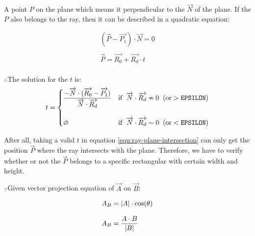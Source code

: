 A point $P$ on the plane which means it perpendicular to the $\overrightarrow{N}$ of the plane. If the $P$ also belongs to the ray, then it can be described in a quadratic equation:

\begin{equation}
\label{equ:ray-plane-intersection}
\begin{array}{lr}
(\overrightarrow{P} - \overrightarrow{P_1}) \cdot \overrightarrow{N} = 0\\\\
\overrightarrow{P} = \overrightarrow{R_0} + \overrightarrow{R_d} \cdot t\\
\end{array}
\end{equation}

$\therefore$\;\;\;\;The solution for the $t$ is:
\[
t =
\begin{cases}
\dfrac{-\overrightarrow{N} \cdot (\overrightarrow{R_0} - \overrightarrow{P_1})}{\overrightarrow{N} \cdot \overrightarrow{R_d}} & \text{if }\;\overrightarrow{N} \cdot \overrightarrow{R_d} \nsim 0\;\;(\text{or} > \texttt{EPSILON})\\\\
\varnothing & \text{if }\;\overrightarrow{N} \cdot \overrightarrow{R_d} \sim 0\;\;(\text{or} < \texttt{EPSILON})\\
\end{cases}
\]

After all, taking a valid $t$ in equation \ref{equ:ray-plane-intersection} can only get the position $\overrightarrow{P}$ where the ray intersects with the plane. Therefore, we have to verify whether or not the $\overrightarrow{P}$ belongs to a specific rectangular with certain width and height. 

$\because$\;\;\;\;Given vector projection equation of $\overrightarrow{A}$ on $\overrightarrow{B}$:

\begin{equation}
\label{equ:vector-projection}
\begin{array}{lr}
A_{B} = \lvert A \rvert \cdot \cos(\theta)\\\\
A_{B} = \dfrac{A \cdot B}{\lvert B \rvert}\\
\end{array}
\end{equation}

